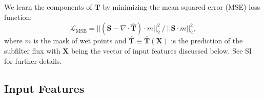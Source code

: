 \documentclass[draft]{agujournal2019}
\begin{document}
We learn the components of $\mathbf{T}$ by minimizing the  mean squared error (MSE) loss function:
\begin{equation}
\mathcal{L}_{\mathrm{MSE}} = ||(\mathbf{S} - \nabla \cdot \widehat{\mathbf{T}}) \cdot m ||_2^2 ~ / ~||\mathbf{S} \cdot m||_2^2, \label{eq:mse_loss}
\end{equation}
where $m$ is the mask of wet points and $\widehat{\mathbf{T}} \equiv \widehat{\mathbf{T}}(\mathbf{X})$ is the prediction of the subfilter flux with $\mathbf{X}$ being the vector of input features discussed below. See SI for further details.  

\subsection{Input Features}
\end{document}
